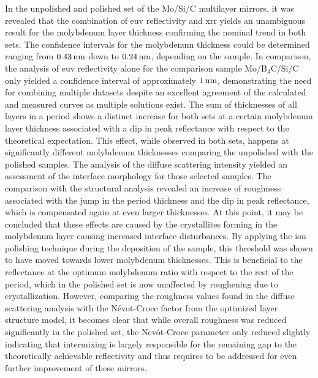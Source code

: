 In the unpolished and polished set of the Mo/Si/C multilayer mirrors, it was revealed that the combination of \gls{euv} reflectivity and \glsdesc{xrr} yields an unambiguous result for the molybdenum layer thickness confirming the nominal trend in both sets. The confidence intervals for the molybdenum thickness could be determined ranging from $\nm{0.43}$ down to $\nm{0.24}$, depending on the sample. In comparison, the analysis of \gls{euv} reflectivity alone for the comparison sample Mo/B$_4$C/Si/C only yielded a confidence interval of approximately $\nm{1}$, demonstrating the need for combining multiple datasets despite an excellent agreement of the calculated and measured curves as multiple solutions exist.
The sum of thicknesses of all layers in a period shows a distinct increase for both sets at a certain molybdenum layer thickness associated with a dip in peak reflectance with respect to the theoretical expectation. This effect, while observed in both sets, happens at significantly different molybdenum thicknesses comparing the unpolished with the polished samples. The analysis of the diffuse scattering intensity yielded an assessment of the interface morphology for those selected samples. The comparison with the structural analysis revealed an increase of roughness associated with the jump in the period thickness and the dip in peak reflectance, which is compensated again at even larger thicknesses. At this point, it may be concluded that these effects are caused by the crystallites forming in the molybdenum layer causing increased interface disturbances. By applying the ion polishing technique during the deposition of the sample, this threshold was shown to have moved towards lower molybdenum thicknesses. This is beneficial to the reflectance at the optimum molybdenum ratio with respect to the rest of the period, which in the polished set is now unaffected by roughening due to crystallization. However, comparing the roughness values found in the diffuse scattering analysis with the N{\'e}vot-Croce factor from the optimized layer structure model, it becomes clear that while overall roughness was reduced significantly in the polished set, the Nev{\'o}t-Croce parameter only reduced slightly indicating that intermixing is largely responsible for the remaining gap to the theoretically achievable reflectivity and thus requires to be addressed for even further improvement of these mirrors.

